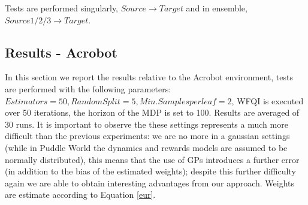       \noindent Tests are performed singularly, $Source \rightarrow Target$ and in ensemble, $Source 1/2/3 \rightarrow Target$.

    \vspace{10cm}
    \subsection{Results - Acrobot}
    \noindent In this section we report the results relative to the Acrobot environment, tests are performed with the following
    parameters: $Estimators = 50, Random Split = 5, Min. Samples per leaf = 2$, WFQI is executed over 50 iterations,
    the horizon of the MDP is set to 100. Results are averaged of 30 runs.\newline
    It is important to observe the these settings represents a much more difficult than the previous
    experiments: we are no more in a gaussian settings (while in Puddle World the dynamics and rewards models are
    assumed to be normally distributed), this means that the use of GPs introduces a further error (in addition
    to the bias of the estimated weights); despite this further difficulty again we are able to obtain interesting
    advantages from our approach. Weights are estimate according to Equation \ref{eur}.

